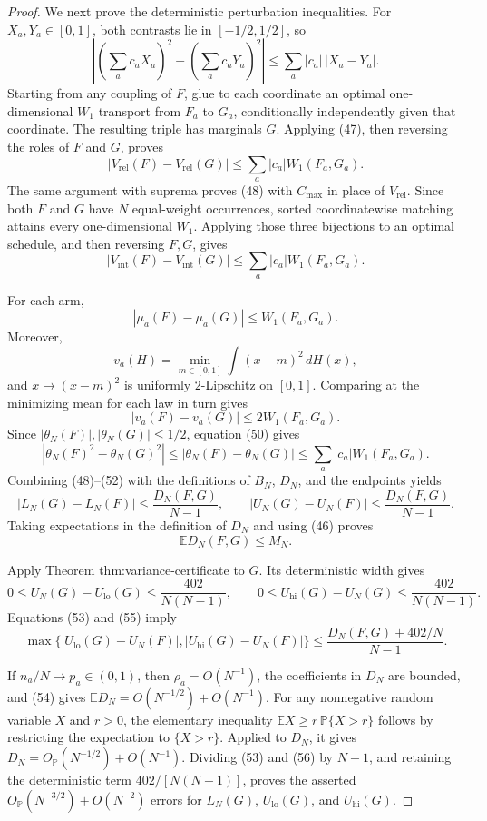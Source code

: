 \documentclass{article}
\begin{document}
\begin{proof}
We next prove the deterministic perturbation inequalities.  For \(X_a,Y_a\in[0,1]\), both contrasts lie in \([-1/2,1/2]\), so
\[
 \left|\left(\sum_ac_aX_a\right)^2-
 \left(\sum_ac_aY_a\right)^2\right|
 \le\sum_a|c_a|\,|X_a-Y_a|. \tag{47}
\]
Starting from any coupling of \(F\), glue to each coordinate an optimal one-dimensional \(W_1\) transport from \(F_a\) to \(G_a\), conditionally independently given that coordinate.  The resulting triple has marginals \(G\).  Applying (47), then reversing the roles of \(F\) and \(G\), proves
\[
 |V_{\mathrm{rel}}(F)-V_{\mathrm{rel}}(G)|
 \le\sum_a|c_a|W_1(F_a,G_a). \tag{48}
\]
The same argument with suprema proves (48) with \(C_{\max}\) in place of \(V_{\mathrm{rel}}\).  Since both \(F\) and \(G\) have \(N\) equal-weight occurrences, sorted coordinatewise matching attains every one-dimensional \(W_1\).  Applying those three bijections to an optimal schedule, and then reversing \(F,G\), gives
\[
 |V_{\mathrm{int}}(F)-V_{\mathrm{int}}(G)|
 \le\sum_a|c_a|W_1(F_a,G_a). \tag{49}
\]

For each arm,
\[
 |\mu_a(F)-\mu_a(G)|\le W_1(F_a,G_a). \tag{50}
\]
Moreover,
\[
 v_a(H)=\min_{m\in[0,1]}\int(x-m)^2\,dH(x),
\]
and \(x\mapsto(x-m)^2\) is uniformly \(2\)-Lipschitz on \([0,1]\).  Comparing at the minimizing mean for each law in turn gives
\[
 |v_a(F)-v_a(G)|\le2W_1(F_a,G_a). \tag{51}
\]
Since \(|\theta_N(F)|,|\theta_N(G)|\le1/2\), equation (50) gives
\[
 |\theta_N(F)^2-\theta_N(G)^2|
 \le|\theta_N(F)-\theta_N(G)|
 \le\sum_a|c_a|W_1(F_a,G_a). \tag{52}
\]
Combining (48)--(52) with the definitions of \(B_N\), \(D_N\), and the endpoints yields
\[
 |L_N(G)-L_N(F)|\le\frac{D_N(F,G)}{N-1},\qquad
 |U_N(G)-U_N(F)|\le\frac{D_N(F,G)}{N-1}. \tag{53}
\]
Taking expectations in the definition of \(D_N\) and using (46) proves
\[
 \mathbb ED_N(F,G)\le M_N. \tag{54}
\]

Apply Theorem thm:variance-certificate to \(G\).  Its deterministic width gives
\[
 0\le U_N(G)-U_{\mathrm{lo}}(G)\le\frac{402}{N(N-1)},
 \qquad
 0\le U_{\mathrm{hi}}(G)-U_N(G)\le\frac{402}{N(N-1)}. \tag{55}
\]
Equations (53) and (55) imply
\[
 \max\{|U_{\mathrm{lo}}(G)-U_N(F)|,
 |U_{\mathrm{hi}}(G)-U_N(F)|\}
 \le\frac{D_N(F,G)+402/N}{N-1}. \tag{56}
\]

If \(n_a/N\to p_a\in(0,1)\), then \(\rho_a=O(N^{-1})\), the coefficients in \(D_N\) are bounded, and (54) gives \(\mathbb ED_N=O(N^{-1/2})+O(N^{-1})\).  For any nonnegative random variable \(X\) and \(r>0\), the elementary inequality \(\mathbb EX\ge r\,\mathbb P\{X>r\}\) follows by restricting the expectation to \(\{X>r\}\).  Applied to \(D_N\), it gives \(D_N=O_{\mathbb P}(N^{-1/2})+O(N^{-1})\).  Dividing (53) and (56) by \(N-1\), and retaining the deterministic term \(402/[N(N-1)]\), proves the asserted \(O_{\mathbb P}(N^{-3/2})+O(N^{-2})\) errors for \(L_N(G)\), \(U_{\mathrm{lo}}(G)\), and \(U_{\mathrm{hi}}(G)\).


\end{proof}
\end{document}
